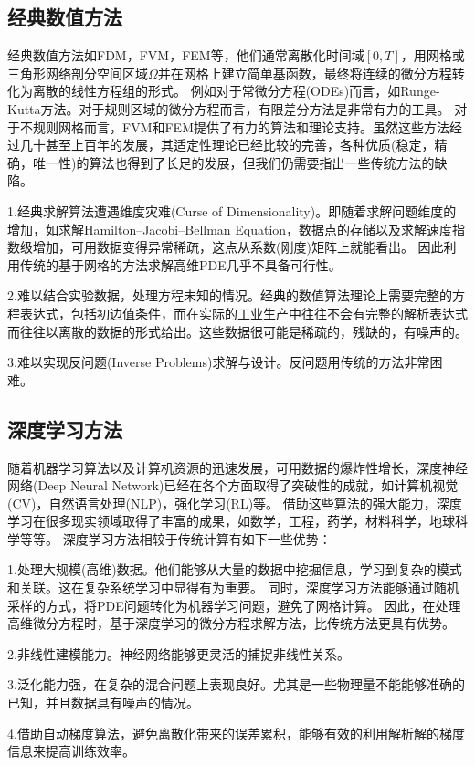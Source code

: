 \subsection{经典数值方法}
经典数值方法如FDM，FVM，FEM等，他们通常离散化时间域$[0,T]$，用网格或三角形网络剖分空间区域$\Omega$并在网格上建立简单基函数，最终将连续的微分方程转化为离散的线性方程组的形式。
例如对于常微分方程(ODEs)而言，如Runge-Kutta方法。对于规则区域的微分方程而言，有限差分方法是非常有力的工具。
对于不规则网格而言，FVM和FEM提供了有力的算法和理论支持。虽然这些方法经过几十甚至上百年的发展，其适定性理论已经比较的完善，各种优质(稳定，精确，唯一性)的算法也得到了长足的发展，但我们仍需要指出一些传统方法的缺陷。

1.经典求解算法遭遇维度灾难(Curse of Dimensionality)。即随着求解问题维度的增加，如求解Hamilton–Jacobi–Bellman Equation，数据点的存储以及求解速度指数级增加，可用数据变得异常稀疏，这点从系数(刚度)矩阵上就能看出。
因此利用传统的基于网格的方法求解高维PDE几乎不具备可行性。

2.难以结合实验数据，处理方程未知的情况。经典的数值算法理论上需要完整的方程表达式，包括初边值条件，而在实际的工业生产中往往不会有完整的解析表达式而往往以离散的数据的形式给出。这些数据很可能是稀疏的，残缺的，有噪声的。

3.难以实现反问题(Inverse Problems)求解与设计。反问题用传统的方法非常困难。

\subsection{深度学习方法}
随着机器学习算法以及计算机资源的迅速发展，可用数据的爆炸性增长，深度神经网络(Deep Neural Network)已经在各个方面取得了突破性的成就，如计算机视觉(CV)，自然语言处理(NLP)，强化学习(RL)等。
借助这些算法的强大能力，深度学习在很多现实领域取得了丰富的成果，如数学，工程，药学，材料科学，地球科学等等。
深度学习方法相较于传统计算有如下一些优势：

1.处理大规模(高维)数据。他们能够从大量的数据中挖掘信息，学习到复杂的模式和关联。这在复杂系统学习中显得有为重要。
同时，深度学习方法能够通过随机采样的方式，将PDE问题转化为机器学习问题，避免了网格计算。
因此，在处理高维微分方程时，基于深度学习的微分方程求解方法，比传统方法更具有优势。

2.非线性建模能力。神经网络能够更灵活的捕捉非线性关系。

3.泛化能力强，在复杂的混合问题上表现良好。尤其是一些物理量不能能够准确的已知，并且数据具有噪声的情况。

4.借助自动梯度算法，避免离散化带来的误差累积，能够有效的利用解析解的梯度信息来提高训练效率。



